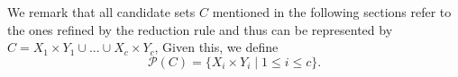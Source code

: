 {{We remark that all candidate sets $C$ mentioned in the following sections refer to the ones refined by the reduction rule and thus can be represented by $C=X_1\times Y_1\cup ...\cup X_c\times Y_c$,  Given this, we define
\begin{equation}
    \mathcal{P}(C)=\{X_i\times Y_i \mid 1\leq i \leq c\}.
\end{equation}

}

}
